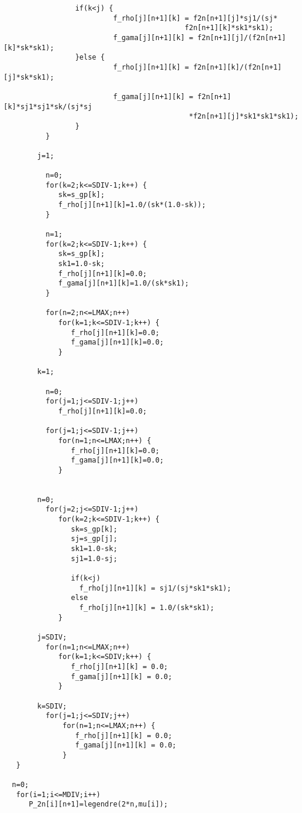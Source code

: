 \begin{verbatim}
                 if(k<j) {   
                          f_rho[j][n+1][k] = f2n[n+1][j]*sj1/(sj*
                                           f2n[n+1][k]*sk1*sk1);
                          f_gama[j][n+1][k] = f2n[n+1][j]/(f2n[n+1][k]*sk*sk1);
                 }else {     
                          f_rho[j][n+1][k] = f2n[n+1][k]/(f2n[n+1][j]*sk*sk1);

                          f_gama[j][n+1][k] = f2n[n+1][k]*sj1*sj1*sk/(sj*sj
                                            *f2n[n+1][j]*sk1*sk1*sk1);
                 }
	      }
   
        j=1;
 
          n=0; 
          for(k=2;k<=SDIV-1;k++) {
             sk=s_gp[k];
             f_rho[j][n+1][k]=1.0/(sk*(1.0-sk));
          }

          n=1;
          for(k=2;k<=SDIV-1;k++) {
             sk=s_gp[k];
             sk1=1.0-sk;         
             f_rho[j][n+1][k]=0.0;
             f_gama[j][n+1][k]=1.0/(sk*sk1);
          }

          for(n=2;n<=LMAX;n++)
             for(k=1;k<=SDIV-1;k++) {
                f_rho[j][n+1][k]=0.0;
                f_gama[j][n+1][k]=0.0;
             }

        k=1;
 
          n=0;
          for(j=1;j<=SDIV-1;j++)
             f_rho[j][n+1][k]=0.0;

          for(j=1;j<=SDIV-1;j++)
             for(n=1;n<=LMAX;n++) {
                f_rho[j][n+1][k]=0.0;
                f_gama[j][n+1][k]=0.0;
             }
 
 
        n=0;
          for(j=2;j<=SDIV-1;j++)
             for(k=2;k<=SDIV-1;k++) {
                sk=s_gp[k];
                sj=s_gp[j];
                sk1=1.0-sk;
                sj1=1.0-sj;

                if(k<j) 
                  f_rho[j][n+1][k] = sj1/(sj*sk1*sk1);
                else     
                  f_rho[j][n+1][k] = 1.0/(sk*sk1);
             }
 
        j=SDIV;
          for(n=1;n<=LMAX;n++)
             for(k=1;k<=SDIV;k++) {
                f_rho[j][n+1][k] = 0.0;
                f_gama[j][n+1][k] = 0.0;
             }

        k=SDIV;
          for(j=1;j<=SDIV;j++)
              for(n=1;n<=LMAX;n++) {
                 f_rho[j][n+1][k] = 0.0;
                 f_gama[j][n+1][k] = 0.0;
              }
   }

  n=0;
   for(i=1;i<=MDIV;i++)
      P_2n[i][n+1]=legendre(2*n,mu[i]);


\end{verbatim}
